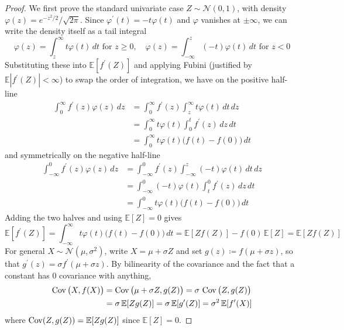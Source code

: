   \begin{proof}
    We first prove the standard univariate case $Z \sim \mathcal{N}(0, 1)$, with density $\varphi(z) = e^{-z^2/2} / \sqrt{2\pi}$. Since $\varphi^\prime (t) = -t \varphi(t)$ and $\varphi$ vanishes at $\pm \infty$, we can write the density itself as a tail integral 
    \begin{equation}
      \varphi(z) = \int_z^\infty t \varphi(t) \,dt \text{ for } z \geq 0, \quad \varphi(z) = \int_{-\infty}^z (-t) \varphi(t) \,dt \text{ for } z < 0
    \end{equation}
    Substituting these into $\mathbb{E}[f^\prime (Z)]$ and applying Fubini (justified by $\mathbb{E}|f^\prime (Z)| < \infty$) to swap the order of integration, we have on the positive half-line 
    \begin{align*}
      \int_0^\infty f^\prime (z) \varphi(z) \,dz & = \int_0^\infty f^\prime (z) \int_z^\infty t \varphi(t) \,dt \,dz \\
      & = \int_0^\infty t \varphi(t) \int_0^t f^\prime (z) \,dz \,dt \\
      & = \int_0^\infty t \varphi(t) \big( f(t) - f(0) \big) \,dt
    \end{align*}
    and symmetrically on the negative half-line 
    \begin{align*}
      \int_{-\infty}^0 f^\prime (z) \varphi(z) \,dz & = \int_{-\infty}^0 f^\prime (z) \int_{-\infty}^z (-t) \varphi(t) \,dt \,dz \\
      & = \int_{-\infty}^0 (-t) \varphi(t) \int_t^0 f^\prime (z) \,dz \,dt \\
      & = \int_{-\infty}^0 t \varphi(t) \big( f(t) - f(0) \big) \,dt
    \end{align*}
    Adding the two halves and using $\mathbb{E}[Z] = 0$ gives 
    \begin{equation}
      \mathbb{E}[f^\prime (Z)] = \int_{-\infty}^\infty t \varphi(t) \big( f(t) - f(0) \big) \,dt = \mathbb{E}[Z f(Z)] - f(0) \, \mathbb{E}[Z] = \mathbb{E}[Z f(Z)]
    \end{equation}
    For general $X \sim \mathcal{N}(\mu, \sigma^2)$, write $X = \mu + \sigma Z$ and set $g(z) \coloneqq f(\mu + \sigma z)$, so that $g^\prime (z) = \sigma f^\prime (\mu + \sigma z)$. By bilinearity of the covariance and the fact that a constant has $0$ covariance with anything, 
    \begin{align*}
      \operatorname{Cov} \big( X, f(X) \big) & = \operatorname{Cov} \big( \mu + \sigma Z, g(Z) \big) = \sigma \, \operatorname{Cov} \big( Z, g(Z) \big) \\
      & = \sigma \, \mathbb{E}[Z g(Z)] = \sigma \, \mathbb{E}[g^\prime (Z)] = \sigma^2 \, \mathbb{E}[f^\prime (X)]
    \end{align*}
    where $\operatorname{Cov}(Z, g(Z)) = \mathbb{E}[Z g(Z)]$ since $\mathbb{E}[Z] = 0$. 


\end{proof}
